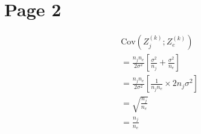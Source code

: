 \documentclass[
]{article}
\begin{document}
\section*{Page 2}

\begin{align*}
& \text{Cov}\left(Z_j^{(k)}; Z_e^{(k)}\right) \\
& = \frac{n_j n_e}{2 \sigma^2} \left[ \frac{\sigma^2}{n_j} + \frac{\sigma^2}{n_e} \right] \\
& = \frac{n_j n_e}{2 \sigma^2} \left[ \frac{1}{n_j n_e} \times 2 n_j \sigma^2 \right] \\
& = \sqrt{\frac{n_j}{n_e}} \\
& = \frac{n_j}{n_e}
\end{align*}
\end{document}
